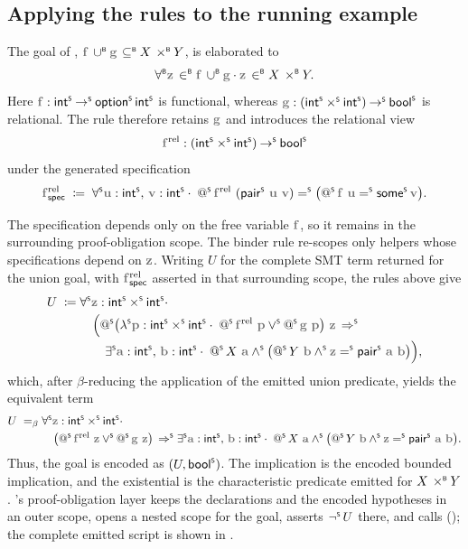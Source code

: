 \subsection{Applying the rules to the running example}
\label{sec:beer-rules-running-example}

The goal of ,
\(\var{f}\cupB\var{g}\subseteqB X\prodB Y\), is elaborated to
\[
  \forallB \var{z}\inB\var{f}\cupB\var{g}\cdot
  \var{z}\inB X\prodB Y.
\]
Here \(\var{f}:\intS\toS\optS\intS\) is functional, whereas
\(\var{g}:(\intS\timesS\intS)\toS\boolS\) is relational.
The  rule therefore retains \(\var{g}\) and introduces the relational view
\[
  \var{f}^{\mathrm{rel}}:
    (\intS\timesS\intS)\toS\boolS
\]
under the generated specification
\[
  \spec{\var{f}^{\mathrm{rel}}}
  \;\coloneq\;
  \forallS \var{u}:\intS,\,\var{v}:\intS\cdot\;
    \appS{\var{f}^{\mathrm{rel}}}{(\pairS{\var{u}}{\var{v}})}
    \eqS
    \bigl(\appS{\var{f}}{\var{u}}\eqS\someS\var{v}\bigr).
\]

The specification depends only on the free variable \(\var{f}\), so it remains in the surrounding proof-obligation scope.
The binder rule re-scopes only helpers whose specifications depend on \(\var{z}\).
Writing \(U\) for the complete SMT term returned for the union goal, with \(\spec{\var{f}^{\mathrm{rel}}}\) asserted in that surrounding scope, the rules above give
\[
\begin{aligned}
U \;\coloneq\;&
  \forallS \var{z}:\intS\timesS\intS\cdot \\[-1pt]
  &\quad \Bigl(
    \appS{
      \bigl(\lamS \var{p}:\intS\timesS\intS\cdot\;
        \appS{\var{f}^{\mathrm{rel}}}{\var{p}}
        \orS \appS{\var{g}}{\var{p}}\bigr)
    }{\var{z}}
    \impS \\[-1pt]
  &\qquad
    \existsS \var{a}:\intS,\,\var{b}:\intS\cdot\;
      \appS{X}{\var{a}}
      \andS\bigl(
        \appS{Y}{\var{b}}
        \andS \var{z}\eqS\pairS{\var{a}}{\var{b}}
      \bigr)
  \Bigr),
\end{aligned}
\]
which, after \(\beta\)-reducing the application of the emitted union predicate, yields the equivalent term
\[
\begin{aligned}
U \;=_{\beta}\;&
  \forallS \var{z}:\intS\timesS\intS\cdot \\[-1pt]
  &\quad
    \bigl(\appS{\var{f}^{\mathrm{rel}}}{\var{z}}\orS\appS{\var{g}}{\var{z}}\bigr)\impS
    \existsS \var{a}:\intS,\,\var{b}:\intS\cdot\;
    \appS{X}{\var{a}}\andS
    \bigl(\appS{Y}{\var{b}}\andS\var{z}\eqS\pairS{\var{a}}{\var{b}}\bigr).
\end{aligned}
\]
Thus, the goal is encoded as \((U,\mathsf{bool}^{\scriptscriptstyle{\mathsf{S}}})\).
The implication is the encoded bounded implication, and the existential is the characteristic predicate emitted for \(X\mathbin{\,\times^{\scriptscriptstyle{\mathsf{B}}}} Y\).
\beer{}'s proof-obligation layer keeps the declarations and the encoded hypotheses in an outer scope, opens a nested scope for the goal, asserts \(\mathop{\neg^{\scriptscriptstyle{\mathsf{S}}}} U\) there, and calls  (); the complete emitted script is shown in .
